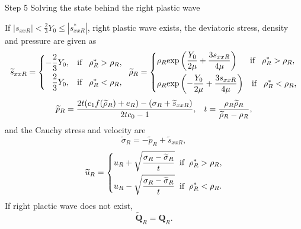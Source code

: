 \documentclass{article}
\theoremstyle{plain}\newtheorem{definition}{\sc{Definition}}
\theoremstyle{defination}\newtheorem{example}{Example}[section]
\numberwithin{equation}{section}
\numberwithin{table}{section}
\begin{document}
Step 5 Solving the state behind the right plastic wave

\vspace{0.3cm} \hspace{0.4cm}  If $|s_{xxR}| < \frac{2}{3}Y_0 \le |s_{xxR}^*| $, right plastic wave exists, the deviatoric stress, density and pressure  are given as
\begin{equation*}
  \widetilde{s}_{xxR} =\left\{ \begin{aligned}
	  -\frac{2}{3}Y_0, \hspace{0.3cm} \text{if} \hspace{0.3cm} \rho_R^* > \rho_R,\\
	  \frac{2}{3}Y_0, \hspace{0.3cm} \text{if} \hspace{0.3cm} \rho_R^* < \rho_R,\\
	\end{aligned}\right.
	\hspace{0.2cm} \widetilde{\rho}_{R} = \left\{ \begin{aligned}
	  & \rho_R \text{exp}\left(\frac{Y_0}{2\mu}+\frac{3 s_{xxR}}{4\mu}\right)  \hspace{0.5cm} \text{if} \hspace{0.3cm} \rho_R^* > \rho_R,\\ 
& \rho_R \text{exp}\left(-\frac{Y_0}{2\mu}+\frac{3 s_{xxR}}{4\mu}\right) 
\hspace{0.3cm} \text{if} \hspace{0.3cm} \rho_R^* < \rho_R,\\ 
  \end{aligned}\right.
 \end{equation*}
\begin{equation*}
  \widetilde{p}_R= \frac{2t(c_1f(\widetilde{\rho}_R)+e_R)-(\sigma_R+\widetilde{s}_{xxR})}{2tc_0-1}, \hspace{0.3cm} 
t=\frac{\rho_R \widetilde{\rho}_R}{\widetilde{\rho}_R-\rho_R},
\end{equation*}
and the Cauchy stress and velocity are
\begin{equation*}
\widetilde{\sigma}_R = -\widetilde{p}_R+\widetilde{s}_{xxR},
\end{equation*}
\begin{equation*}
  \widetilde{u}_R= \left\{
  \begin{aligned}
	u_R+\sqrt{\frac{\sigma_R-\widetilde{\sigma}_R}{t}} \hspace{0.2cm} \text{if} \hspace{0.2cm} \rho_R^* >\rho_R,\\
	u_R-\sqrt{\frac{\sigma_R-\widetilde{\sigma}_R}{t}} \hspace{0.2cm} \text{if} \hspace{0.2cm} \rho_R^* <\rho_R.\\
\end{aligned} \right.
\end{equation*}
If right  plactic wave does not exist,
\begin{equation*}
  \widetilde{\bm{Q}}_R = \bm{Q}_R.
\end{equation*}
\end{document}
